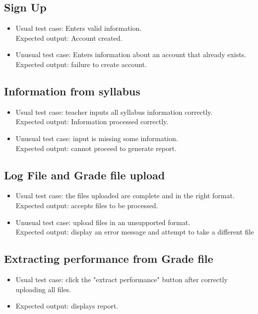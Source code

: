 \documentclass[12pt]{article}
\begin{document}
\subsection{Sign Up}
\begin{itemize}
	\item Usual test case: Enters valid information. \\ Expected output: Account created.
	\item Unusual test case: Enters information about an account that already exists.
		\\ Expected output: failure to create account.
\end{itemize}
\subsection{Information from syllabus}
\begin{itemize}
	\item Usual test case: teacher inputs all syllabus information correctly.\\
		Expected output: Information processed correctly.
	\item Unusual test case: input is missing some information. \\
		Expected output: cannot proceed to generate report.
\end{itemize}
\subsection{Log File and Grade file upload}
\begin{itemize}
	\item Usual test case: the files uploaded are complete and in the right format. \\
		Expected output: accepts files to be processed.
	\item Unusual test case: upload files in an unsupported format.\\
		Expected output: display an error message and attempt to take a different file
\end{itemize}

\subsection{Extracting performance from Grade file}
\begin{itemize}
	\item Usual test case: click the "extract performance" button after correctly uploading all files.
	\item Expected output: displays report.
\end{itemize}
\end{document}
